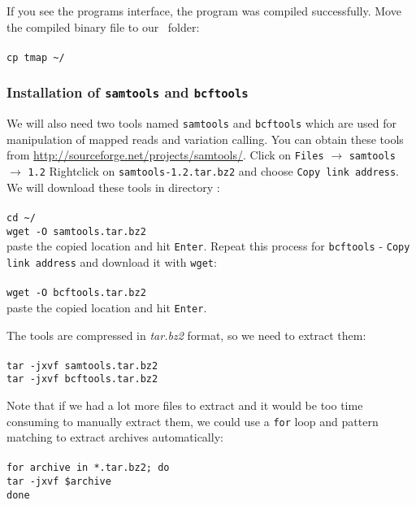 If you see the programs interface, the program was compiled successfully.
Move the compiled binary file to our \texttt{\binDir}~folder:\\~\\
\texttt{cp tmap \textasciitilde/\binDir}\\
\subsubsection{Installation of \texttt{samtools} and \texttt{bcftools}}
We will also need two tools named \texttt{samtools} and \texttt{bcftools} which are used for
manipulation of mapped reads and variation calling. You can obtain these tools from
\url{http://sourceforge.net/projects/samtools/}. Click on \texttt{Files} $\rightarrow$ \texttt{samtools} $\rightarrow$ \texttt{1.2}
Rightclick on \texttt{samtools-1.2.tar.bz2} and choose \texttt{Copy link address}. 
We will download these tools in directory \texttt{\progDir}:\\~\\
\texttt{cd \textasciitilde/\progDir}\\
\texttt{wget -O samtools.tar.bz2}\\

paste the copied location and hit \texttt{Enter}.
Repeat this process for \texttt{bcftools} - \texttt{Copy link address} and
download it with \texttt{wget}:\\~\\
\texttt{wget -O bcftools.tar.bz2}\\

paste the copied location and hit \texttt{Enter}.

The tools are compressed in \textit{tar.bz2}
format, so we need to extract them:\\~\\
\texttt{tar -jxvf samtools.tar.bz2}\\
\texttt{tar -jxvf bcftools.tar.bz2}\\

\begin{framed}
Note that if we had a lot more files to extract and it would be too
time consuming to manually extract them, we could use a \texttt{for}
loop and pattern matching to extract archives automatically:\\~\\
\texttt{for archive in *.tar.bz2; do}\\
\texttt{\indent tar -jxvf \$archive}\\
\texttt{done}
\end{framed}

